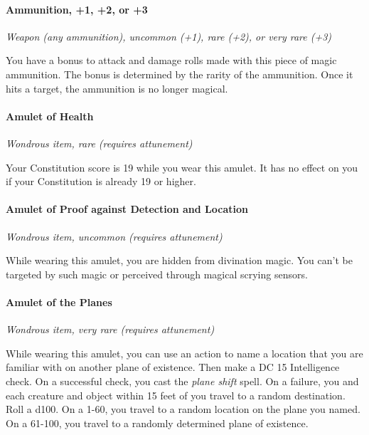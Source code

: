 \documentclass[
]{article}
\begin{document}
\hypertarget{ammunition-1-2-or-3}{%
\paragraph{Ammunition, +1, +2, or +3}\label{ammunition-1-2-or-3}}

\emph{Weapon (any ammunition), uncommon (+1), rare (+2), or very rare
(+3)}

You have a bonus to attack and damage rolls made with this piece of
magic ammunition. The bonus is determined by the rarity of the
ammunition. Once it hits a target, the ammunition is no longer magical.

\hypertarget{amulet-of-health}{%
\paragraph{Amulet of Health}\label{amulet-of-health}}

\emph{Wondrous item, rare (requires attunement)}

Your Constitution score is 19 while you wear this amulet. It has no
effect on you if your Constitution is already 19 or higher.

\hypertarget{amulet-of-proof-against-detection-and-location}{%
\paragraph{Amulet of Proof against Detection and
Location}\label{amulet-of-proof-against-detection-and-location}}

\emph{Wondrous item, uncommon (requires attunement)}

While wearing this amulet, you are hidden from divination magic. You
can't be targeted by such magic or perceived through magical scrying
sensors.

\hypertarget{amulet-of-the-planes}{%
\paragraph{Amulet of the Planes}\label{amulet-of-the-planes}}

\emph{Wondrous item, very rare (requires attunement)}

While wearing this amulet, you can use an action to name a location that
you are familiar with on another plane of existence. Then make a DC 15
Intelligence check. On a successful check, you cast the \emph{plane
shift} spell. On a failure, you and each creature and object within 15
feet of you travel to a random destination. Roll a d100. On a 1-60, you
travel to a random location on the plane you named. On a 61-100, you
travel to a randomly determined plane of existence.
\end{document}
